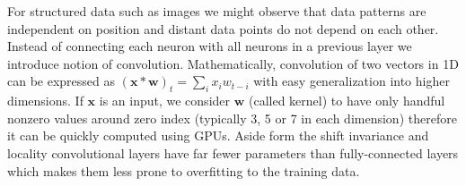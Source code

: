 For structured data such as images we might observe that data patterns are independent on position and distant data points do not depend on each other. Instead of connecting each neuron with all neurons in a previous layer we introduce notion of convolution. Mathematically, convolution of two vectors in 1D can be expressed as $(\bm{x}*\bm{w})_t=\sum_i x_i w_{t-i}$ with easy generalization into higher dimensions. If $\bm{x}$ is an input, we consider $\bm{w}$ (called kernel) to have only handful nonzero values around zero index (typically 3, 5 or 7 in each dimension) therefore it can be quickly computed using GPUs. Aside form the shift invariance and locality convolutional layers have far fewer parameters than fully-connected layers which makes them less prone to overfitting to the training data.






